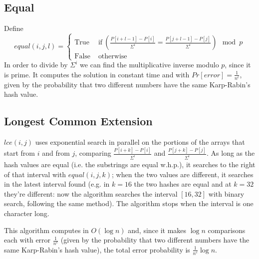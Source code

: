\documentclass{article}
\begin{document}
\subsection{Equal}
Define 
$$
equal(i,j,l)=\begin{cases}
\textrm{True} & \textrm{ if}\ (\frac{P[i+l-1]-P[i]}{\Sigma^i}=\frac{P[j+l-1]-P[j]}{\Sigma^i})\mod p\\
\textrm{False} & \textrm{ otherwise}
\end{cases}
$$
In order to divide by $\Sigma^i$ we can find the multiplicative inverse modulo $p$, since it is prime. It computes the solution in constant time and with $Pr[error]=\frac{1}{n^c}$, given by the probability that two different numbers have the same Karp-Rabin's hash value.

\subsection{Longest Common Extension}
$lce(i,j)$ uses exponential search in parallel on the portions of the arrays that start from $i$ and from $j$, comparing $\frac{P[i+k]-P[i]}{\Sigma^i}$ and $\frac{P[j+k]-P[j]}{\Sigma^i}$. As long as the hash values are equal (i.e. the substrings are equal w.h.p.), it searches to the right of that interval with $equal(i,j,k)$; when the two values are different, it searches in the latest interval found (e.g. in $k=16$ the two hashes are equal and at $k=32$ they're different: now the algorithm searches the interval $[16,32]$ with binary search, following the same method). The algorithm stops when the interval is one character long. 

This algorithm computes in $O(\log n)$ and, since it makes $\log n$ comparisons each with error $\frac{1}{n^c}$ (given by the probability that two different numbers have the same Karp-Rabin's hash value), the total error probability is $\frac{1}{n^c}\log n$.
\end{document}
